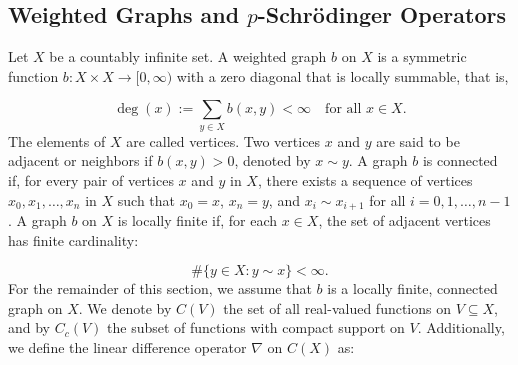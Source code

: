 \documentclass[11pt]{amsart}
\newcommand{\1}{[1]}
\begin{document}
\subsection*{Weighted Graphs and $p$-Schrödinger Operators} Let $X$ be a countably infinite set. A weighted graph $b$ on $X$ is a symmetric function $b: X \times X \to [0, \infty)$ with a zero diagonal that is locally summable, that is,

$$
\deg(x) := \sum_{y \in X} b(x, y) < \infty \quad \text{for all } x \in X.
$$
The elements of $X$ are called vertices. Two vertices $x$ and $y$ are said to be adjacent or neighbors if $b(x, y) > 0$, denoted by $x \sim y$. A graph $b$ is connected if, for every pair of vertices $x$ and $y$ in $X$, there exists a sequence of vertices $x_0, x_1, \dots, x_n$ in $X$ such that $x_0 = x$, $x_n = y$, and $x_i \sim x_{i+1}$ for all $i = 0, 1, \dots, n-1$. A graph $b$ on $X$ is locally finite if, for each $x \in X$, the set of adjacent vertices has finite cardinality:

$$\#\{y \in X : y \sim x\} < \infty.$$
For the remainder of this section, we assume that $b$ is a locally finite, connected graph on $X$. We denote by $C(V)$ the set of all real-valued functions on $V \subseteq X$, and by $C_c(V)$ the subset of functions with compact support on $V$. Additionally, we define the linear difference operator $\nabla$ on $C(X)$ as:
\end{document}
